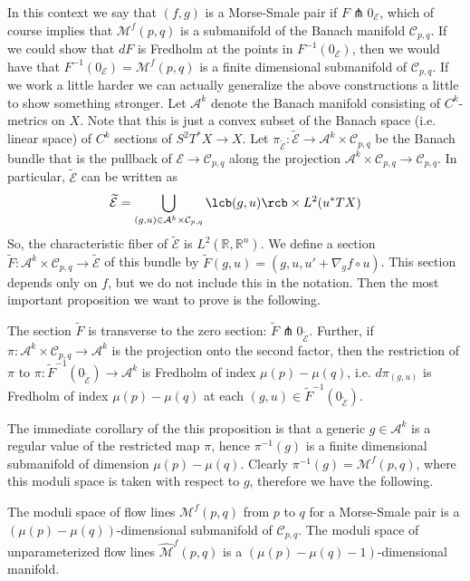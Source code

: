 In this context we say that $(f,g)$ is a Morse-Smale pair if $F \pitchfork 0_{\mathcal E}$, which of course implies that $\mathcal M^f(p,q)$ is a submanifold of the Banach manifold $\mathcal C_{p,q}$. If we could show that $dF$ is Fredholm at the points in $F^{-1}(0_{\mathcal E})$, then we would have that $F^{-1}(0_{\mathcal E}) = \mathcal M^f(p,q)$ is a finite dimensional submanifold of $\mathcal C_{p,q}$. If we work a little harder we can actually generalize the above constructions a little to show something stronger. Let $\mathcal A^k$ denote the Banach manifold consisting of $C^k$-metrics on $X$. Note that this is just a convex subset of the Banach space (i.e. linear space) of $C^k$ sections of $S^2 T^* X \rightarrow X$. Let $\pi_{\widetilde{\mathcal E}} : \widetilde{\mathcal E} \rightarrow \mathcal A^k \times \mathcal C_{p,q}$ be the Banach bundle that is the pullback of $\mathcal E \rightarrow \mathcal C_{p,q}$ along the projection $\mathcal A^k \times \mathcal C_{p,q} \rightarrow \mathcal C_{p,q}$. In particular, $\widetilde{\mathcal E}$ can be written as
\[ \widetilde{\mathcal E} = \bigcup_{(g,u) \in \mathcal A^k \times \mathcal C_{p,q}} \lcb (g,u) \rcb \times L^2(u^* TX) \]
So, the characteristic fiber of $\widetilde{\mathcal E}$ is $L^2(\mathbb R,\mathbb R^n)$. We define a section $\widetilde F : \mathcal A^k \times \mathcal C_{p,q} \rightarrow \widetilde{\mathcal E}$ of this bundle by $\widetilde F(g,u) = (g,u,u'+\nabla_g f \circ u)$. This section depends only on $f$, but we do not include this in the notation. Then the most important proposition we want to prove is the following.
\begin{prop}
\label{genericity of Morse-Smale metric}
The section $\widetilde{F}$ is transverse to the zero section: $\widetilde{F} \pitchfork 0_{\widetilde{\mathcal{E}}}$. Further, if $\pi : \mathcal A^k \times \mathcal C_{p,q} \rightarrow \mathcal A^k$ is the projection onto the second factor, then the restriction of $\pi$ to $\pi : \widetilde F^{-1}(0_{\widetilde{\mathcal E}}) \rightarrow \mathcal A^k$ is Fredholm of index $\mu(p)-\mu(q)$, i.e. $d\pi_{(g,u)}$ is Fredholm of index $\mu(p)-\mu(q)$ at each $(g,u) \in \widetilde F^{-1}(0_{\widetilde{\mathcal E}})$.
\end{prop}
The immediate corollary of the this proposition is that a generic $g \in \mathcal A^k$ is a regular value of the restricted map $\pi$, hence $\pi^{-1}(g)$ is a finite dimensional submanifold of dimension $\mu(p)-\mu(q)$. Clearly $\pi^{-1}(g) = \mathcal M^f(p,q)$, where this moduli space is taken with respect to $g$, therefore we have the following.
\begin{cor}
The moduli space of flow lines $\mathcal M^f(p,q)$ from $p$ to $q$ for a Morse-Smale pair is a $(\mu(p)-\mu(q))$-dimensional submanifold of $\mathcal C_{p,q}$. The moduli space of unparameterized flow lines $\widehat{\mathcal M}^f(p,q)$ is a $(\mu(p)-\mu(q)-1)$-dimensional manifold.
\end{cor}

